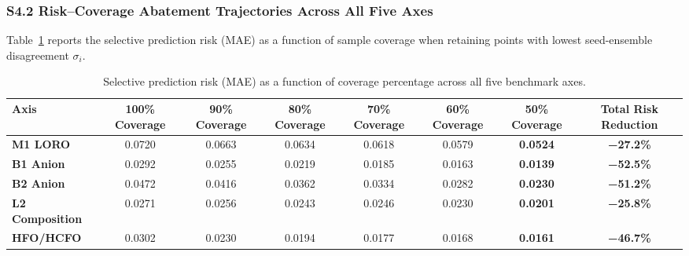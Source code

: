 
\subsubsection*{S4.2 Risk--Coverage Abatement Trajectories Across All Five Axes}
Table~\ref{tab:si_risk_coverage} reports the selective prediction risk (MAE) as a function of sample coverage when retaining points with lowest seed-ensemble disagreement $\sigma_i$.

\begin{table}[htbp]
\centering
\small
\caption{Selective prediction risk (MAE) as a function of coverage percentage across all five benchmark axes.}
\label{tab:si_risk_coverage}
\begin{tabular}{lccccccc}
\toprule
\textbf{Axis} & \textbf{100\% Coverage} & \textbf{90\% Coverage} & \textbf{80\% Coverage} & \textbf{70\% Coverage} & \textbf{60\% Coverage} & \textbf{50\% Coverage} & \textbf{Total Risk Reduction} \\
\midrule
\textbf{M1 LORO} & 0.0720 & 0.0663 & 0.0634 & 0.0618 & 0.0579 & \textbf{0.0524} & \textbf{−27.2\%} \\
\textbf{B1 Anion} & 0.0292 & 0.0255 & 0.0219 & 0.0185 & 0.0163 & \textbf{0.0139} & \textbf{−52.5\%} \\
\textbf{B2 Anion} & 0.0472 & 0.0416 & 0.0362 & 0.0334 & 0.0282 & \textbf{0.0230} & \textbf{−51.2\%} \\
\textbf{L2 Composition} & 0.0271 & 0.0256 & 0.0243 & 0.0246 & 0.0230 & \textbf{0.0201} & \textbf{−25.8\%} \\
\textbf{HFO/HCFO} & 0.0302 & 0.0230 & 0.0194 & 0.0177 & 0.0168 & \textbf{0.0161} & \textbf{−46.7\%} \\
\bottomrule
\end{tabular}
\end{table}
